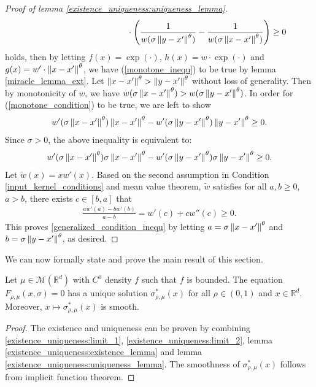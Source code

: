 \begin{proof}[Proof of lemma \ref{existence_uniqueness:uniqueness_lemma}]
\begin{align}
         & \qquad \qquad \qquad \qquad \qquad \qquad \cdot \left(\frac{1}{w(\sigma\left\lVert y-x'\right\rVert^{\theta})}-\frac{1}{w(\sigma\left\lVert x-x'\right\rVert^{\theta})}\right) \geq 0
    \end{align}
    holds, then by letting $f(x) = \exp(\cdot)$, $h(x) = w \cdot \exp(\cdot)$ and $g(x) = w'\cdot \left\lVert x-x'\right\rVert^{\theta}$, we have (\ref{monotone_inequ}) to be true by lemma \ref{miracle_lemma_ext}. Let $\left\lVert x-x'\right\rVert^{\theta} > \left\lVert y-x'\right\rVert^{\theta}$ without loss of generality. Then by monotonicity of $w$, we have $w(\sigma\left\lVert x-x'\right\rVert^{\theta})>w(\sigma\left\lVert y-x'\right\rVert^{\theta})$. In order for (\ref{monotone_condition}) to be true, we are left to show
    \begin{align}
        w'(\sigma\left\lVert x-x'\right\rVert^{\theta})\left\lVert x-x'\right\rVert^{\theta}-w'(\sigma\left\lVert y-x'\right\rVert^{\theta})\left\lVert y-x'\right\rVert^{\theta} \geq 0.
    \end{align}
    Since $\sigma >0$, the above inequality is equivalent to:
    \begin{align} \label{generalized_condition_inequ}
        w'(\sigma\left\lVert x-x'\right\rVert^{\theta})\sigma \left\lVert x-x'\right\rVert^{\theta}-w'(\sigma\left\lVert y-x'\right\rVert^{\theta}) \sigma \left\lVert y-x'\right\rVert^{\theta} \geq 0.
    \end{align}
    Let $\tilde{w}(x) = x w'(x)$. Based on the second assumption in Condition \ref{input_kernel_conditions} and mean value theorem, $\tilde{w}$ satisfies for all $a,b\geq 0$, $a>b$, there exists $c \in [b,a]$ that
    \begin{align}
        \frac{aw'(a) - bw'(b)}{a-b} = w'(c) + cw''(c) \geq 0.
    \end{align}
    This proves \eqref{generalized_condition_inequ} by letting $a = \sigma\left\lVert x-x'\right\rVert^{\theta}$ and $b = \sigma\left\lVert y-x'\right\rVert^{\theta}$, as desired.
\end{proof}
We can now formally state and prove the main result of this section.
\begin{proposition}
    Let $\mu \in \mathcal{M}(\mathbb{R}^d)$ with $C^0$ density $f$ such that $f$ is bounded. The equation $F_{\rho,\mu}(x,\sigma) = 0$ has a unique solution $\sigma^*_{\rho,\mu}(x)$ for all $\rho \in (0,1)$ and $x \in \mathbb{R}^d$. Moreover, $x \mapsto \sigma^*_{\rho,\mu}(x)$ is smooth.
\end{proposition}
\begin{proof}
    The existence and uniqueness can be proven by combining \eqref{existence_uniqueness:limit_1}, \eqref{existence_uniqueness:limit_2}, lemma \ref{existence_uniqueness:existence_lemma} and lemma \ref{existence_uniqueness:uniqueness_lemma}. The smoothness of $\sigma^*_{\rho,\mu}(x)$ follows from implicit function theorem.
\end{proof}
